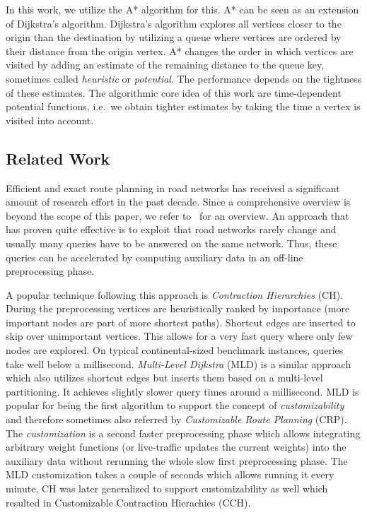 \documentclass[a4paper,UKenglish,cleveref, autoref, thm-restate]{lipics-v2021}
\begin{document}
In this work, we utilize the A* algorithm for this.
A* can be seen as an extension of Dijkstra's algorithm.
Dijkstra's algorithm explores all vertices closer to the origin than the destination by utilizing a queue where vertices are ordered by their distance from the origin vertex.
A* changes the order in which vertices are visited by adding an estimate of the remaining distance to the queue key, sometimes called \emph{heuristic} or \emph{potential}.
The performance depends on the tightness of these estimates.
The algorithmic core idea of this work are time-dependent potential functions, i.e.\ we obtain tighter estimates by taking the time a vertex is visited into account.

\subsection{Related Work}

Efficient and exact route planning in road networks has received a significant amount of research effort in the past decade.
Since a comprehensive overview is beyond the scope of this paper, we refer to~\cite{TODO} for an overview.
An approach that has proven quite effective is to exploit that road networks rarely change and usually many queries have to be answered on the same network.
Thus, these queries can be accelerated by computing auxiliary data in an off-line preprocessing phase.

A popular technique following this approach is \emph{Contraction Hierarchies} (CH).
During the preprocessing vertices are heuristically ranked by importance (more important nodes are part of more shortest paths).
Shortcut edges are inserted to skip over unimportant vertices.
This allows for a very fast query where only few nodes are explored.
On typical continental-sized benchmark instances, queries take well below a millisecond.
\emph{Multi-Level Dijkstra} (MLD) is a similar approach which also utilizes shortcut edges but inserts them based on a multi-level partitioning.
It achieves slightly slower query times around a millisecond.
MLD is popular for being the first algorithm to support the concept of \emph{customizability} and therefore sometimes also referred by \emph{Customizable Route Planning} (CRP).
The \emph{customization} is a second faster preprocessing phase which allows integrating arbitrary weight functions (or live-traffic updates the current weights) into the auxiliary data without rerunning the whole slow first preprocessing phase.
The MLD customization takes a couple of seconds which allows running it every minute.
CH was later generalized to support customizability as well which resulted in Customizable Contraction Hierachies (CCH).
\end{document}
